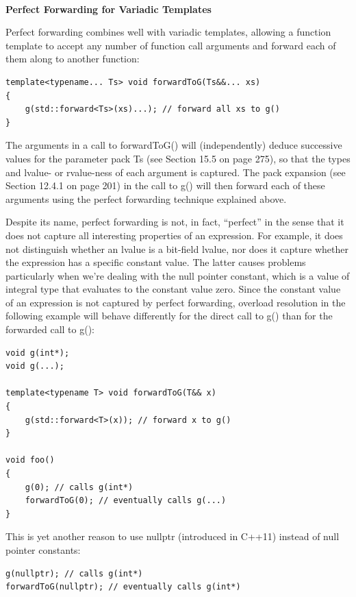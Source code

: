 \hspace*{\fill} \\ %
\noindent
\textbf{Perfect Forwarding for Variadic Templates}

Perfect forwarding combines well with variadic templates, allowing a function template to accept any number of function call arguments and forward each of them along to another function:

\begin{lstlisting}[style=styleCXX]
template<typename... Ts> void forwardToG(Ts&&... xs)
{
	g(std::forward<Ts>(xs)...); // forward all xs to g()
}
\end{lstlisting}

The arguments in a call to forwardToG() will (independently) deduce successive values for the parameter pack Ts (see Section 15.5 on page 275), so that the types and lvalue- or rvalue-ness of each argument is captured. The pack expansion (see Section 12.4.1 on page 201) in the call to g() will then forward each of these arguments using the perfect forwarding technique explained above.

Despite its name, perfect forwarding is not, in fact, “perfect” in the sense that it does not capture all interesting properties of an expression. For example, it does not distinguish whether an lvalue is a bit-field lvalue, nor does it capture whether the expression has a specific constant value. The latter causes problems particularly when we’re dealing with the null pointer constant, which is a value of integral type that evaluates to the constant value zero. Since the constant value of an expression is not captured by perfect forwarding, overload resolution in the following example will behave differently for the direct call to g() than for the forwarded call to g():

\begin{lstlisting}[style=styleCXX]
void g(int*);
void g(...);

template<typename T> void forwardToG(T&& x)
{
	g(std::forward<T>(x)); // forward x to g()
}

void foo()
{
	g(0); // calls g(int*)
	forwardToG(0); // eventually calls g(...)
}
\end{lstlisting}

This is yet another reason to use nullptr (introduced in C++11) instead of null pointer constants:

\begin{lstlisting}[style=styleCXX]
g(nullptr); // calls g(int*)
forwardToG(nullptr); // eventually calls g(int*)
\end{lstlisting}

